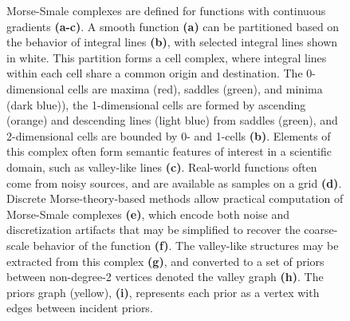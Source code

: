 \begin{figure}[t]
 \centering
     \caption{ Morse-Smale complexes are defined for functions with continuous gradients {\bf(a-c)}. A smooth function {\bf(a)} can be partitioned based on the behavior of integral lines {\bf(b)}, with selected integral lines shown in white. This partition forms a cell complex, where integral lines within each cell share a common origin and destination. The 0-dimensional cells are  maxima (red), saddles (green), and minima (dark blue)), the 1-dimensional cells are formed by ascending (orange) and descending lines (light blue) from saddles (green), and 2-dimensional cells are bounded by 0- and 1-cells {\bf(b)}. Elements of this complex often form semantic features of interest in a scientific domain, such as valley-like lines {\bf(c)}. Real-world functions often come from noisy sources, and are available as samples on a grid {\bf(d)}. Discrete Morse-theory-based methods allow practical computation of Morse-Smale complexes {\bf(e)}, which encode both noise and discretization artifacts that may be simplified to recover the coarse-scale behavior of the function {\bf(f)}. The valley-like structures may be extracted from this complex {\bf(g)}, and converted to a set of priors between non-degree-2 vertices denoted the valley graph {\bf(h)}. The priors graph (yellow), {\bf(i)}, represents each prior as a vertex with edges between incident priors. }
     \label{mscbackground}

     \vspace{-.6cm}
     
 \end{figure}

